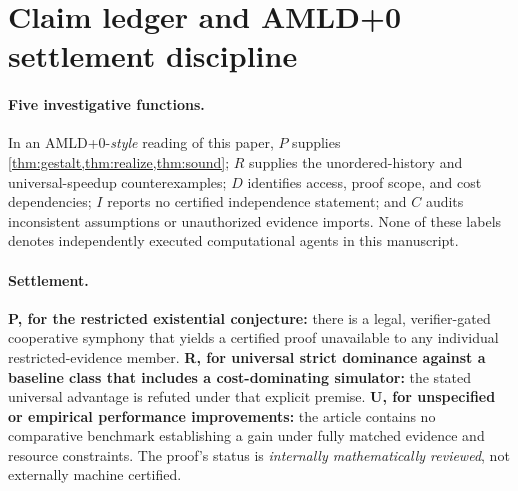 \documentclass[11pt,letterpaper]{article}
\theoremstyle{definition}
\theoremstyle{remark}
\begin{document}
\section{Claim ledger and AMLD+0 settlement discipline}
\paragraph{Five investigative functions.} In an AMLD+0-\emph{style} reading of this paper, $P$ supplies \cref{thm:gestalt,thm:realize,thm:sound}; $R$ supplies the unordered-history and universal-speedup counterexamples; $D$ identifies access, proof scope, and cost dependencies; $I$ reports no certified independence statement; and $C$ audits inconsistent assumptions or unauthorized evidence imports. None of these labels denotes independently executed computational agents in this manuscript.

\paragraph{Settlement.} \textbf{P, for the restricted existential conjecture:} there is a legal, verifier-gated cooperative symphony that yields a certified proof unavailable to any individual restricted-evidence member. \textbf{R, for universal strict dominance against a baseline class that includes a cost-dominating simulator:} the stated universal advantage is refuted under that explicit premise. \textbf{U, for unspecified or empirical performance improvements:} the article contains no comparative benchmark establishing a gain under fully matched evidence and resource constraints. The proof's status is \emph{internally mathematically reviewed}, not externally machine certified.
\end{document}
